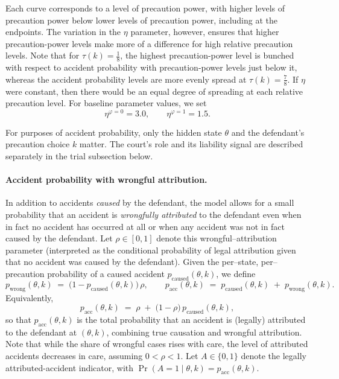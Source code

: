\documentclass{article}
\begin{document}
Each curve corresponds to a level of precaution power, with higher levels of precaution power below lower levels of precaution power, including at the endpoints. The variation in the $\eta$ parameter, however, ensures that higher precaution-power levels make more of a difference for high relative precaution levels. Note that for $\tau(k) = \tfrac{1}{8}$, the highest precaution-power level is bunched with respect to accident probability with precaution-power levels just below it, whereas the accident probability levels are more evenly spread at $\tau(k) = \tfrac{7}{8}$. If $\eta$ were constant, then there would be an equal degree of spreading at each relative precaution level. For baseline parameter values, we set
\[
\eta^{\varphi=0}=3.0, \qquad \eta^{\varphi=1}=1.5.
\]

For purposes of accident probability, only the hidden state $\theta$ and the defendant’s precaution choice $k$ matter. The court’s role and its liability signal are described separately in the trial subsection below.

\paragraph{Accident probability with wrongful attribution.}
In addition to accidents \emph{caused} by the defendant, the model allows for a small probability that an accident is \emph{wrongfully attributed} to the defendant even when in fact no accident has occurred at all or when any accident was not in fact caused by the defendant. Let $\rho\in[0,1]$ denote this wrongful–attribution parameter (interpreted as the conditional probability of legal attribution given that no accident was caused by the defendant). Given the per–state, per–precaution probability of a caused accident $p_{\mathrm{caused}}(\theta,k)$, we define
\[
p_{\mathrm{wrong}}(\theta,k)\;=\;\bigl(1 - p_{\mathrm{caused}}(\theta,k)\bigr)\,\rho,
\qquad
p_{\mathrm{acc}}(\theta,k)\;=\;p_{\mathrm{caused}}(\theta,k)\;+\;p_{\mathrm{wrong}}(\theta,k).
\]
Equivalently,
\[
p_{\mathrm{acc}}(\theta,k)
\;=\;\rho \;+\; \bigl(1-\rho\bigr)\,p_{\mathrm{caused}}(\theta,k),
\]
so that $p_{\mathrm{acc}}(\theta,k)$ is the total probability that an accident is (legally) attributed to the defendant at $(\theta,k)$, combining true causation and wrongful attribution.
Note that while the share of wrongful cases rises with care, the level of attributed accidents decreases in care, assuming $0 < \rho < 1$. Let $A\in\{0,1\}$ denote the legally attributed-accident indicator, with $\Pr(A=1\mid \theta,k)=p_{\mathrm{acc}}(\theta,k)$.
\end{document}
